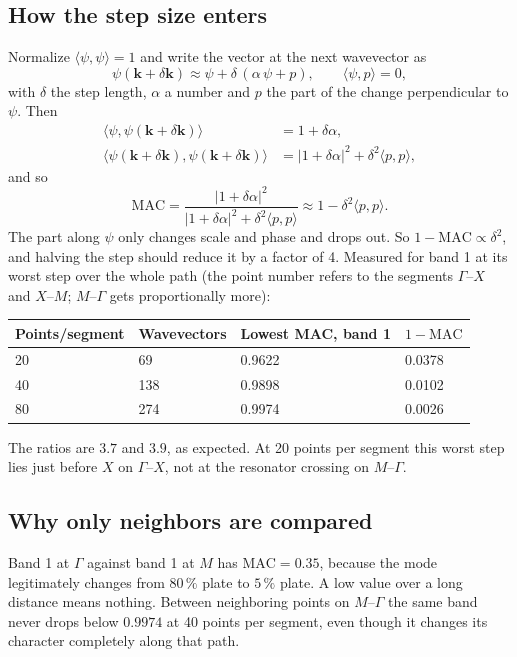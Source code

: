 \subsection{How the step size enters}
Normalize $\langle\psi,\psi\rangle = 1$ and write the vector at the next
wavevector as
\begin{equation}
  \psi(\mathbf{k} + \delta\mathbf{k}) \approx \psi + \delta\,(\alpha\,\psi + p),
  \qquad \langle\psi, p\rangle = 0,
\end{equation}
with $\delta$ the step length, $\alpha$ a number and $p$ the part of the change
perpendicular to $\psi$. Then
\begin{align}
  \langle\psi, \psi(\mathbf{k} + \delta\mathbf{k})\rangle &= 1 + \delta\alpha, \\
  \langle\psi(\mathbf{k} + \delta\mathbf{k}), \psi(\mathbf{k} + \delta\mathbf{k})\rangle &= |1 + \delta\alpha|^2 + \delta^2\langle p, p\rangle ,
\end{align}
and so
\begin{equation}
  \mathrm{MAC} = \frac{|1 + \delta\alpha|^2}{|1 + \delta\alpha|^2 + \delta^2\langle p,p\rangle}
  \approx 1 - \delta^2\langle p, p\rangle .
\end{equation}
The part along $\psi$ only changes scale and phase and drops out. So
$1 - \mathrm{MAC} \propto \delta^2$, and halving the step should reduce it by a
factor of 4. Measured for band 1 at its worst step over the whole path (the point
number refers to the segments $\Gamma$--$X$ and $X$--$M$; $M$--$\Gamma$ gets
proportionally more):

\begin{center}
\begin{tabular}{|l|l|l|l|}
\hline
Points/segment & Wavevectors & Lowest MAC, band 1 & $1 - \mathrm{MAC}$ \\
\hline
20 & 69 & 0.9622 & 0.0378 \\
40 & 138 & 0.9898 & 0.0102 \\
80 & 274 & 0.9974 & 0.0026 \\
\hline
\end{tabular}
\end{center}

The ratios are $3.7$ and $3.9$, as expected. At 20 points per segment this worst
step lies just before $X$ on $\Gamma$--$X$, not at the resonator crossing on
$M$--$\Gamma$.

\subsection{Why only neighbors are compared}
Band 1 at $\Gamma$ against band 1 at $M$ has $\mathrm{MAC} = 0.35$, because the mode
legitimately changes from $80\,\%$ plate to $5\,\%$ plate. A low value over a long
distance means nothing. Between neighboring points on $M$--$\Gamma$ the same band
never drops below $0.9974$ at 40 points per segment, even though it changes its
character completely along that path.


